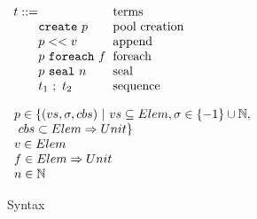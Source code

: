 \begin{figure}[t]


\begin{minipage}[b]{5 cm}
$\ba[t]{l@{\hspace{2mm}}l}
t    ::=                                                           & \mbox{terms}              \\
\gap \texttt{create}~p                                   & \mbox{pool creation}  \\
\gap p << v                                                  & \mbox{append}           \\
\gap p~\texttt{foreach}~f                             & \mbox{foreach}           \\
\gap p~\texttt{seal}~n                                  & \mbox{seal}                \\
\gap t_1~;~t_2                                               & \mbox{sequence}        \\
\ea$
\end{minipage}
\begin{minipage}[b]{7 cm}
$\ba[t]{l@{\hspace{2mm}}l}
p \in \set{(vs, \sigma, cbs)~|~vs \subseteq Elem, \sigma \in \set{-1} \cup \mathbb{N}, \\
\text{ } cbs \subset Elem \Rightarrow Unit} \\
v \in Elem \\
f \in Elem \Rightarrow Unit \\
n \in \mathbb{N}
\ea$
\end{minipage}


\caption{Syntax}\label{fig:syntax}
\end{figure}

